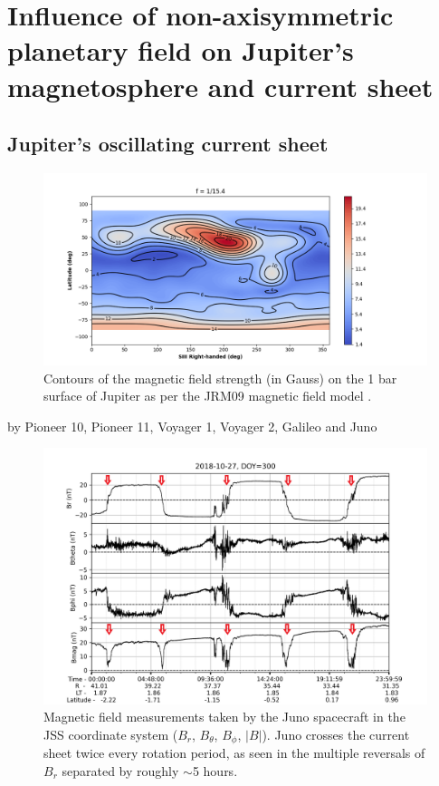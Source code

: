 \chapter{Influence of non-axisymmetric planetary field on Jupiter's magnetosphere and current sheet}

\section{Jupiter's oscillating current sheet}

\begin{figure}
    \centering
    \includegraphics[width=\textwidth]{images6/JRM09_Bmag.png}
    \caption{Contours of the magnetic field strength (in Gauss) on the 1 bar surface of Jupiter as per the JRM09 magnetic field model \protect\cite{Connerney2018}.}
    \label{fig:JRM09}
\end{figure}

by Pioneer 10, Pioneer 11, Voyager 1, Voyager 2, Galileo and Juno

\begin{figure}
    \centering
    \includegraphics[width=\textwidth]{images6/Juno-currentsheet-observations.png}
    \caption{Magnetic field measurements taken by the Juno spacecraft in the JSS coordinate system ($B_r$, $B_\theta$, $B_\phi$, $|B|$). Juno crosses the current sheet twice every rotation period, as seen in the multiple reversals of $B_r$ separated by roughly $\sim$5 hours.}
    \label{fig:juno-current-sheet}
\end{figure}

